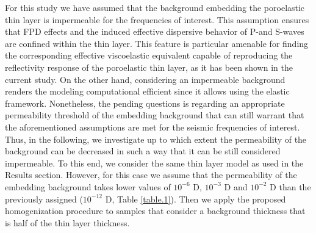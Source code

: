 \documentclass[draft]{agujournal2019}
\begin{document}
For this study we have assumed that the background embedding the poroelastic thin layer is impermeable for the frequencies of interest. This assumption ensures that FPD effects and the induced effective dispersive behavior of P-and S-waves are confined within the thin layer. This feature is particular amenable for finding the corresponding effective viscoelastic equivalent capable of reproducing the reflectivity response of the poroelastic thin layer, as it has been shown in the current study. On the other hand, considering an impermeable background renders the modeling computational efficient since it allows using the elastic framework. Nonetheless, the pending questions is regarding an appropriate permeability threshold of the embedding background that can still warrant that the aforementioned assumptions are met for the seismic frequencies of interest. Thus, in the following, we investigate up to which extent the permeability of the background can be decreased in such a way that it can be still considered impermeable.
 To this end, we consider the same thin layer model as used in the Results section. However, for this case we assume that the permeability of the embedding background takes lower values of $10^{-6}$ D, $10^{-3}$ D and $10^{-2}$ D than the previously assigned ($10^{-12}$ D, Table \ref{table.1}). Then we apply the proposed homogenization procedure to samples that consider a background thickness that is half of the thin layer thickness. 
\end{document}
